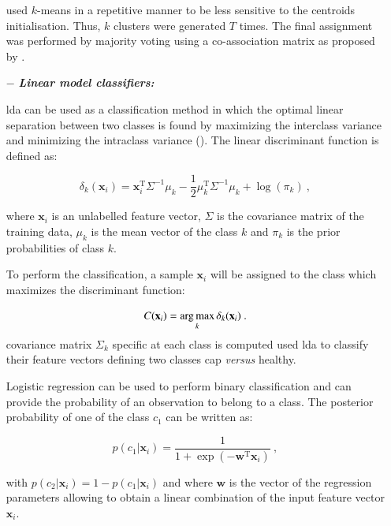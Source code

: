 \begin{enumerate}[leftmargin=*]
\cite{Tiwari2008,Viswanath2008,Viswanath2008a} used $k$-means in a repetitive manner to be less sensitive to the centroids initialisation. Thus, $k$ clusters were generated $T$ times. The final assignment was performed by majority voting using a co-association matrix as proposed by \cite{Fred2005}.

\item[$-$] \textbf{\textit{Linear model classifiers:}} 

\Acf{lda} can be used as a classification method in which the optimal linear separation between two classes is found by maximizing the interclass variance and minimizing the intraclass variance (\cite{Friedman1989}). The linear discriminant function is defined as:

\begin{equation}
	\delta_{k}(\mathbf{x}_i) = \mathbf{x}_i^{\text{T}} \Sigma^{-1} \mu_k - \frac{1}{2} \mu_{k}^{\text{T}} \Sigma^{-1} \mu_k + \log (\pi_k) \ ,
	\label{eq:ldafun}
\end{equation}

\noindent where $\mathbf{x}_i$ is an unlabelled feature vector, $\Sigma$ is the covariance matrix of the training data, $\mu_k$ is the mean vector of the class $k$ and $\pi_k$ is the prior probabilities of class $k$.

To perform the classification, a sample $\mathbf{x}_i$ will be assigned to the class which maximizes the discriminant function:

\begin{equation}
	C(\mathbf{x}_i) = \operatorname*{arg\,max}_k \delta_k(\mathbf{x}_i) \ .
	\label{eq:ldaclass}
\end{equation}
covariance matrix $\Sigma_k$ specific at each class is computed
\cite{Antic2013,Chan2003,Niaf2011,Niaf2012,Vos2012} used \ac{lda} to classify their feature vectors defining two classes \ac{cap} \textit{versus} healthy.

Logistic regression can be used to perform binary classification and can provide the probability of an observation to belong to a class. The posterior probability of one of the class $c_1$ can be written as:

\begin{equation}
	p(c_1|\mathbf{x}_i) = \frac{1}{1+\exp(-\mathbf{w}^{\text{T}}\mathbf{x}_i)} \ ,
	\label{eq:postprlr}
\end{equation}

\noindent with $p(c_2|\mathbf{x}_i) = 1 - p(c_1|\mathbf{x}_i)$ and where $\mathbf{w}$ is the vector of the regression parameters allowing to obtain a linear combination of the input feature vector $\mathbf{x}_i$.


\end{enumerate}
